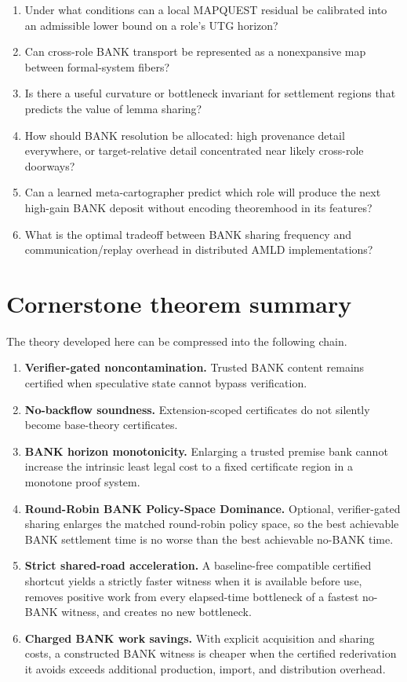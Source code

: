 \documentclass[11pt]{article}
\begin{document}
\begin{enumerate}[label=\textbf{Q\arabic*.}]
\item Under what conditions can a local MAPQUEST residual be calibrated into an admissible lower bound on a role's UTG horizon?
\item Can cross-role BANK transport be represented as a nonexpansive map between formal-system fibers?
\item Is there a useful curvature or bottleneck invariant for settlement regions that predicts the value of lemma sharing?
\item How should BANK resolution be allocated: high provenance detail everywhere, or target-relative detail concentrated near likely cross-role doorways?
\item Can a learned meta-cartographer predict which role will produce the next high-gain BANK deposit without encoding theoremhood in its features?
\item What is the optimal tradeoff between BANK sharing frequency and communication/replay overhead in distributed AMLD implementations?
\end{enumerate}

\section{Cornerstone theorem summary}

The theory developed here can be compressed into the following chain.

\begin{enumerate}[label=\textbf{T\arabic*.}]
\item \textbf{Verifier-gated noncontamination.} Trusted BANK content remains certified when speculative state cannot bypass verification.
\item \textbf{No-backflow soundness.} Extension-scoped certificates do not silently become base-theory certificates.
\item \textbf{BANK horizon monotonicity.} Enlarging a trusted premise bank cannot increase the intrinsic least legal cost to a fixed certificate region in a monotone proof system.
\item \textbf{Round-Robin BANK Policy-Space Dominance.} Optional, verifier-gated sharing enlarges the matched round-robin policy space, so the best achievable BANK settlement time is no worse than the best achievable no-BANK time.
\item \textbf{Strict shared-road acceleration.} A baseline-free compatible certified shortcut yields a strictly faster witness when it is available before use, removes positive work from every elapsed-time bottleneck of a fastest no-BANK witness, and creates no new bottleneck.
\item \textbf{Charged BANK work savings.} With explicit acquisition and sharing costs, a constructed BANK witness is cheaper when the certified rederivation it avoids exceeds additional production, import, and distribution overhead.
\end{enumerate}
\end{document}
